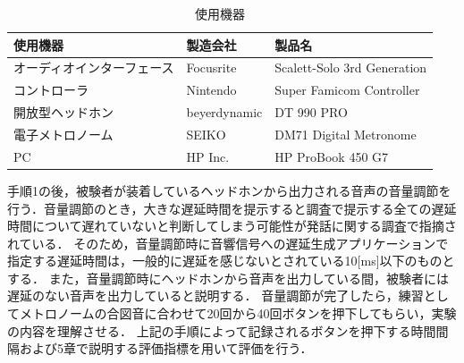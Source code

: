 \begin{table}[tbp]
  \caption{使用機器}
  \label{table:device}
  \centering
  \begin{tabular}{lll}
    \hline
    使用機器 & 製造会社 & 製品名\\
    \hline \hline
    オーディオインターフェース & Focusrite & Scalett-Solo 3rd Generation\\
    コントローラ  & Nintendo & Super Famicom Controller\\
    開放型ヘッドホン & beyerdynamic & DT 990 PRO\\
    電子メトロノーム  & SEIKO  & DM71 Digital Metronome \\
    PC  & HP Inc. & HP ProBook 450 G7 
\\
    \hline
  \end{tabular}
\end{table}
手順1の後，被験者が装着しているヘッドホンから出力される音声の音量調節を行う．音量調節のとき，大きな遅延時間を提示すると調査で提示する全ての遅延時間について遅れていないと判断してしまう可能性が発話に関する調査で指摘されている\cite{Soturonn-takahashi}．
そのため，音量調節時に音響信号への遅延生成アプリケーションで指定する遅延時間は，一般的に遅延を感じないとされている10[ms]以下のものとする．
また，音量調節時にヘッドホンから音声を出力している間，被験者には遅延のない音声を出力していると説明する．
音量調節が完了したら，練習としてメトロノームの合図音に合わせて20回から40回ボタンを押下してもらい，実験の内容を理解させる．
上記の手順によって記録されるボタンを押下する時間間隔および5章で説明する評価指標を用いて評価を行う．

